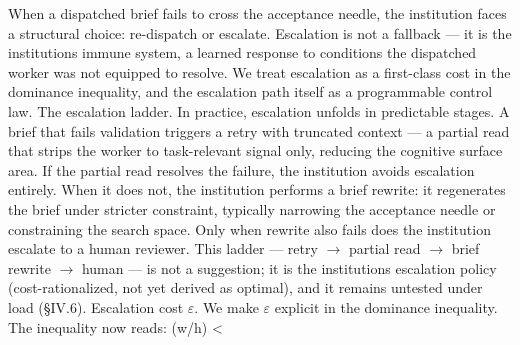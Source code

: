 \documentclass[
]{article}
\begin{document}
When a dispatched brief fails to cross the acceptance needle, the
institution faces a structural choice: re-dispatch or escalate.
Escalation is not a fallback --- it is the institution\textquotesingle s
immune system, a learned response to conditions the dispatched worker
was not equipped to resolve. We treat escalation as a first-class cost
in the dominance inequality, and the escalation path itself as a
programmable control law. The escalation ladder. In practice, escalation
unfolds in predictable stages. A brief that fails validation triggers a
retry with truncated context --- a partial read that strips the worker
to task-relevant signal only, reducing the cognitive surface area. If
the partial read resolves the failure, the institution avoids escalation
entirely. When it does not, the institution performs a brief rewrite: it
regenerates the brief under stricter constraint, typically narrowing the
acceptance needle or constraining the search space. Only when rewrite
also fails does the institution escalate to a human reviewer. This
ladder --- retry $\rightarrow$ partial read $\rightarrow$ brief rewrite $\rightarrow$ human --- is not a
suggestion; it is the institution\textquotesingle s escalation policy
(cost-rationalized, not yet derived as optimal), and it remains untested
under load (\S{}IV.6). Escalation cost $\varepsilon$. We make $\varepsilon$ explicit in the
dominance inequality. The inequality now reads: (w/h) \textless{}
\end{document}

